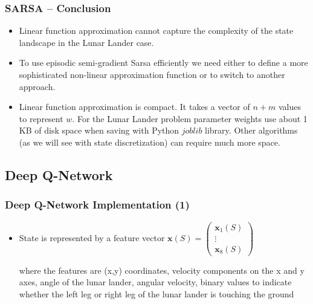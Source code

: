 \documentclass{beamer}
\begin{document}
\begin{frame}
\frametitle{SARSA -- Conclusion}


\begin{itemize}
	\item Linear function approximation 
	cannot capture the complexity
	of the state landscape in the Lunar Lander case.
	
	\item To use 
	episodic semi-gradient Sarsa efficiently we need either 
	to define a more sophisticated non-linear approximation function or to 
	switch to another approach.

	\item Linear function approximation is compact. It takes 
	a vector of $n+m$ values to represent $w$. For the Lunar Lander problem parameter weights use 
	about 1 KB of disk space when saving with Python $joblib$ library.
	Other algorithms (as we will see with state discretization) can 
	require much more space.

\end{itemize}
\end{frame}







\subsection{Deep Q-Network}

\begin{frame}
\frametitle{Deep Q-Network Implementation (1)}
\begin{itemize}
	\item State is represented by a feature vector
	$\mathbf{x}(S)=\left(\begin{array}{c}{\mathbf{x}_{1}(S)} \\ {\vdots} \\ {\mathbf{x}_{8}(S)}\end{array}\right)$
	
	
	where the features are (x,y) coordinates, 
	velocity components on the x and y axes,
	angle of the lunar lander, angular
	velocity, binary values to indicate whether the left
	leg or right leg of the lunar lander is touching the ground	
\end{itemize} 
\end{frame}
\end{document}
